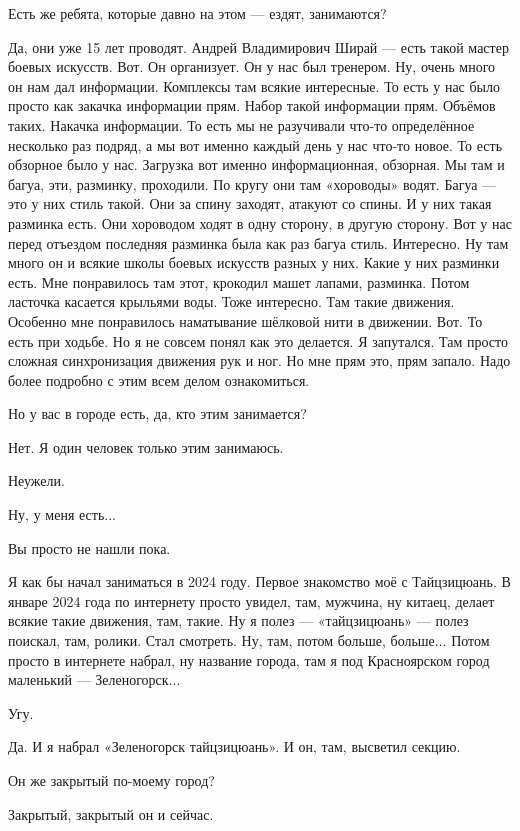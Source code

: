 \A
Есть же ребята, которые давно на этом --- ездят, занимаются?

\I
Да, они уже 15 лет проводят.
Андрей Владимирович Ширай --- есть
такой мастер боевых искусств.
Вот.
Он организует.
Он у нас был тренером.
Ну, очень много он нам дал информации.
Комплексы там всякие интересные.
То есть у нас было просто как закачка информации прям.
Набор такой информации прям.
Объёмов таких.
Накачка информации.
То есть мы не разучивали что-то определённое несколько раз подряд,
а мы вот именно каждый день у нас что-то новое.
То есть обзорное было у нас.
Загрузка вот именно информационная, обзорная.
Мы там и багуа, эти, разминку, проходили. По кругу
они там «хороводы» водят.
Багуа --- это у них стиль такой.
Они за спину заходят, атакуют со спины.
И у них такая разминка есть.
Они хороводом ходят в одну сторону, в другую сторону.
Вот у нас перед отъездом последняя разминка была как раз багуа стиль.
Интересно.
Ну там много он и всякие школы боевых искусств разных у них.
Какие у них разминки есть.
Мне понравилось там этот, крокодил машет лапами, разминка.
Потом ласточка касается крыльями воды.
Тоже интересно.
Там такие движения.
Особенно мне понравилось наматывание шёлковой нити в движении.
Вот.
То есть при ходьбе.
Но я не совсем понял как это делается.
Я запутался.
Там просто сложная синхронизация движения рук и ног.
Но мне прям это, прям запало.
Надо более подробно с этим всем делом ознакомиться.

\A
Но у вас в городе есть, да, кто этим занимается?

\I
Нет.
Я один человек только этим занимаюсь.

\A
Неужели.

\I
Ну, у меня есть...

\A
Вы просто не нашли пока.

\I
Я как бы начал заниматься в 2024 году.
Первое знакомство моё с Тайцзицюань.
В январе
2024 года по интернету просто увидел, там,
мужчина, ну китаец, делает всякие такие движения, там, такие.
Ну я полез --- «тайцзицюань» --- полез поискал, там, ролики. Стал смотреть.
Ну, там, потом больше, больше... Потом просто в интернете набрал, ну название города, там я под
Красноярском город маленький --- Зеленогорск...

\A
Угу.

\I
Да. И я набрал «Зеленогорск тайцзицюань».
И он, там, высветил секцию.

\A
Он же закрытый по-моему город?

\I
Закрытый, закрытый он и сейчас.

